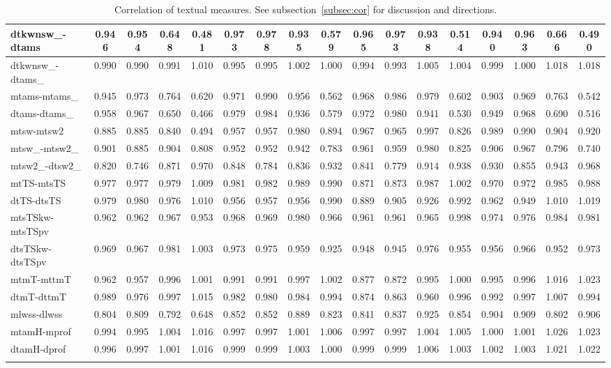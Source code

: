 \documentclass[%
 aip,
 jmp,%
 amsmath,amssymb,
 reprint,%
 floatfix,
]{revtex4-1}
\begin{document}
\begin{longtable*}{|p{2cm}||c|c|c|c|| c|c|c|c|| c|c|c|c|| c|c|c|c|}
dtkwnsw\_-dtams & 0.946 & 0.954 & 0.648 & 0.481 & 0.973 & 0.978 & 0.935 & 0.579 & 0.965 & 0.973 & 0.938 & 0.514 & 0.940 & 0.963 & 0.666 & 0.490 \\ \hline
dtkwnsw\_-dtams\_ & 0.990 & 0.990 & 0.991 & 1.010 & 0.995 & 0.995 & 1.002 & 1.000 & 0.994 & 0.993 & 1.005 & 1.004 & 0.999 & 1.000 & 1.018 & 1.018 \\ \hline
mtams-mtams\_ & 0.945 & 0.973 & 0.764 & 0.620 & 0.971 & 0.990 & 0.956 & 0.562 & 0.968 & 0.986 & 0.979 & 0.602 & 0.903 & 0.969 & 0.763 & 0.542 \\ \hline
dtams-dtams\_ & 0.958 & 0.967 & 0.650 & 0.466 & 0.979 & 0.984 & 0.936 & 0.579 & 0.972 & 0.980 & 0.941 & 0.530 & 0.949 & 0.968 & 0.690 & 0.516 \\ \hline
mtsw-mtsw2 & 0.885 & 0.885 & 0.840 & 0.494 & 0.957 & 0.957 & 0.980 & 0.894 & 0.967 & 0.965 & 0.997 & 0.826 & 0.989 & 0.990 & 0.904 & 0.920 \\ \hline
mtsw\_-mtsw2\_ & 0.901 & 0.885 & 0.904 & 0.808 & 0.952 & 0.952 & 0.942 & 0.783 & 0.961 & 0.959 & 0.980 & 0.825 & 0.906 & 0.967 & 0.796 & 0.740 \\ \hline
mtsw2\_-dtsw2\_ & 0.820 & 0.746 & 0.871 & 0.970 & 0.848 & 0.784 & 0.836 & 0.932 & 0.841 & 0.779 & 0.914 & 0.938 & 0.930 & 0.855 & 0.943 & 0.968 \\ \hline
mtTS-mtsTS & 0.977 & 0.977 & 0.979 & 1.009 & 0.981 & 0.982 & 0.989 & 0.990 & 0.871 & 0.873 & 0.987 & 1.002 & 0.970 & 0.972 & 0.985 & 0.988 \\ \hline
dtTS-dtsTS & 0.979 & 0.980 & 0.976 & 1.010 & 0.956 & 0.957 & 0.956 & 0.990 & 0.889 & 0.905 & 0.926 & 0.992 & 0.962 & 0.949 & 1.010 & 1.019 \\ \hline
mtsTSkw-mtsTSpv & 0.962 & 0.962 & 0.967 & 0.953 & 0.968 & 0.969 & 0.980 & 0.966 & 0.961 & 0.961 & 0.965 & 0.998 & 0.974 & 0.976 & 0.984 & 0.981 \\ \hline
dtsTSkw-dtsTSpv & 0.969 & 0.967 & 0.981 & 1.003 & 0.973 & 0.975 & 0.959 & 0.925 & 0.948 & 0.945 & 0.976 & 0.955 & 0.956 & 0.966 & 0.952 & 0.973 \\ \hline
mtmT-mttmT & 0.962 & 0.957 & 0.996 & 1.001 & 0.991 & 0.991 & 0.997 & 1.002 & 0.877 & 0.872 & 0.995 & 1.000 & 0.995 & 0.996 & 1.016 & 1.023 \\ \hline
dtmT-dttmT & 0.989 & 0.976 & 0.997 & 1.015 & 0.982 & 0.980 & 0.984 & 0.994 & 0.874 & 0.863 & 0.960 & 0.996 & 0.992 & 0.997 & 1.007 & 0.994 \\ \hline
mlwss-dlwss & 0.804 & 0.809 & 0.792 & 0.648 & 0.852 & 0.852 & 0.889 & 0.823 & 0.841 & 0.837 & 0.925 & 0.854 & 0.904 & 0.909 & 0.802 & 0.906 \\ \hline
mtamH-mprof & 0.994 & 0.995 & 1.004 & 1.016 & 0.997 & 0.997 & 1.001 & 1.006 & 0.997 & 0.997 & 1.004 & 1.005 & 1.000 & 1.001 & 1.026 & 1.023 \\ \hline
dtamH-dprof & 0.996 & 0.997 & 1.001 & 1.016 & 0.999 & 0.999 & 1.003 & 1.000 & 0.999 & 0.999 & 1.006 & 1.003 & 1.002 & 1.003 & 1.021 & 1.022 \\ \hline
  \caption{Correlation of textual measures. See subsection~\ref{subsec:cor} for discussion and directions.}\label{tab:corTex}
\end{longtable*}
\end{document}
